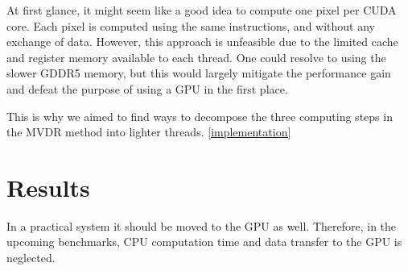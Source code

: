 \documentclass[12pt,journal,captionsoff,onecolumn]{IEEEtran}
\newcommand\1{\vec 1}
\begin{document}
% 
% 


At first glance, it might seem like a good idea to compute one pixel per CUDA core. Each pixel is computed using the same instructions, and without any exchange of data. However, this approach is unfeasible due to the limited cache and register memory available to each thread. One could resolve to using the slower GDDR5 memory, but this would largely mitigate the performance gain and defeat the purpose of using a GPU in the first place.

This is why we aimed to find ways to decompose the three computing steps in the MVDR method into lighter threads. \ref{implementation}


% 




\section{Results}

In a practical system it should be moved to the GPU as well. Therefore, in the upcoming benchmarks, CPU computation time and data transfer to the GPU is neglected.
\end{document}
